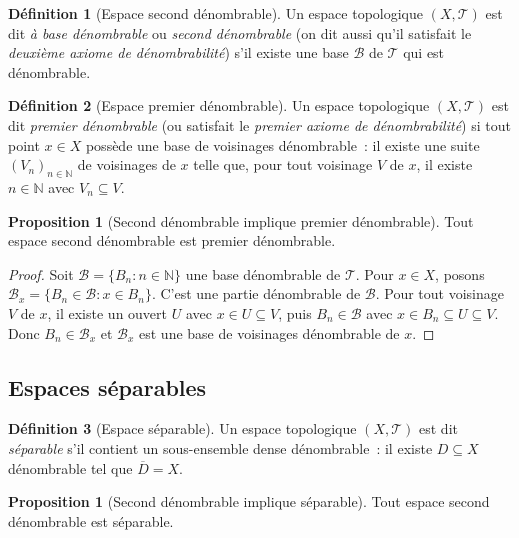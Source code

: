 \documentclass[12pt,a4paper,openany]{book}
\theoremstyle{definition}
\newtheorem{definition}{Définition}[chapter]
\theoremstyle{cours}
\newtheorem{proposition}[theoreme]{Proposition}
\theoremstyle{coursnormal}
\newcommand{\N}{\mathbb{N}}
\newcommand{\T}{\mathcal{T}}
\newcommand{\B}{\mathcal{B}}
\begin{document}
\begin{definition}[Espace second dénombrable]\label{def:second-denombrable}
  Un espace topologique $(X,\T)$ est dit \emph{à base dénombrable} ou
  \emph{second dénombrable} (on dit aussi qu'il
  satisfait le \emph{deuxième axiome de dénombrabilité}) s'il existe une base
  $\B$ de $\T$ qui est dénombrable.
\end{definition}

\begin{definition}[Espace premier dénombrable]\label{def:premier-denombrable}
  Un espace topologique $(X,\T)$ est dit \emph{premier
  dénombrable} (ou satisfait le \emph{premier axiome
  de dénombrabilité}) si tout point $x\in X$ possède une base de voisinages
  dénombrable~: il existe une suite $(V_n)_{n\in\N}$ de voisinages de $x$
  telle que, pour tout voisinage $V$ de $x$, il existe $n\in\N$ avec
  $V_n\subseteq V$.
\end{definition}

\begin{proposition}[Second dénombrable implique premier dénombrable]\label{prop:A2-implique-A1}
  Tout espace second dénombrable est premier dénombrable.
\end{proposition}

\begin{proof}
  Soit $\B=\{B_n : n\in\N\}$ une base dénombrable de $\T$. Pour $x\in X$,
  posons $\B_x = \{B_n\in\B : x\in B_n\}$. C'est une partie dénombrable de
  $\B$. Pour tout voisinage $V$ de $x$, il existe un ouvert $U$ avec
  $x\in U\subseteq V$, puis $B_n\in\B$ avec $x\in B_n\subseteq U\subseteq V$.
  Donc $B_n\in\B_x$ et $\B_x$ est une base de voisinages dénombrable de $x$.
\end{proof}

\subsection{Espaces séparables}\label{subsec:separables}

\begin{definition}[Espace séparable]\label{def:separable}
  Un espace topologique $(X,\T)$ est dit
  \emph{séparable} s'il contient un sous-ensemble
  dense dénombrable~: il existe $D\subseteq X$ dénombrable tel que
  $\overline{D}=X$.
\end{definition}

\begin{proposition}[Second dénombrable implique séparable]\label{prop:A2-implique-separable}
  Tout espace second dénombrable est séparable.
\end{proposition}
\end{document}
